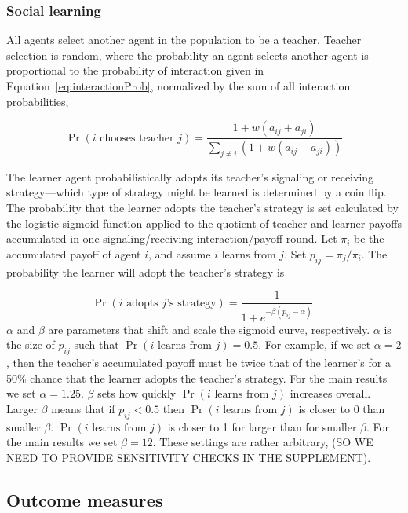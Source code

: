 \documentclass[11pt,letterpaper]{article}
\begin{document}
\subsubsection{Social learning}

All agents select another agent in the population to be a teacher.
Teacher selection is random, where the probability an agent selects another
agent is proportional to the probability of interaction given in 
Equation~\ref{eq:interactionProb}, normalized by the sum of all interaction
probabilities,

\begin{equation}
  \Pr(\text{$i$ chooses teacher $j$}) = 
    \frac{1 + w(a_{ij} + a_{ji})}{\sum_{j \neq i}(1 + w(a_{ij} + a_{ji}))}
\end{equation}

The 
learner agent probabilistically adopts its teacher's signaling or receiving 
strategy---which type of strategy might be learned is determined by a coin flip. 
The probability that the learner adopts the teacher's strategy is set 
calculated by the logistic sigmoid function applied to the quotient of 
teacher and learner payoffs accumulated in one
signaling/receiving-interaction/payoff round.
Let $\pi_{i}$ be the accumulated payoff of agent $i$, and assume $i$ learns
from $j$. Set $p_{ij} = \pi_{j} / \pi_i$. 
The probability the learner will adopt the teacher's strategy is

\begin{equation}
  \Pr(\text{$i$ adopts $j$'s strategy}) = \frac{1}{1 + e^{-\beta(p_{ij} - \alpha)}}.
\end{equation}
\noindent
$\alpha$ and $\beta$ are parameters that shift and scale the sigmoid curve, respectively. 
$\alpha$ is the size of $p_{ij}$ such that $\Pr(\text{$i$ learns from $j$}) = 0.5$. %
For example, if we set $\alpha = 2$, then the teacher's accumulated payoff
must be twice that of the learner's for a 50\% chance that the learner 
adopts the teacher's strategy. 
For the main results we set $\alpha=1.25$. $\beta$ sets how quickly 
$\Pr(\text{$i$ learns from $j$})$ increases overall. Larger $\beta$ means that
if $p_{ij} < 0.5$ then $\Pr(\text{$i$ learns from $j$})$ is closer to 0 than smaller $\beta$. 
$\Pr(\text{$i$ learns from $j$})$ is closer to 1 for larger than for smaller $\beta$. For the main
results we set $\beta = 12$. These settings are rather arbitrary, (SO WE NEED
TO PROVIDE SENSITIVITY CHECKS IN THE SUPPLEMENT).

\subsection{Outcome measures}
\end{document}
